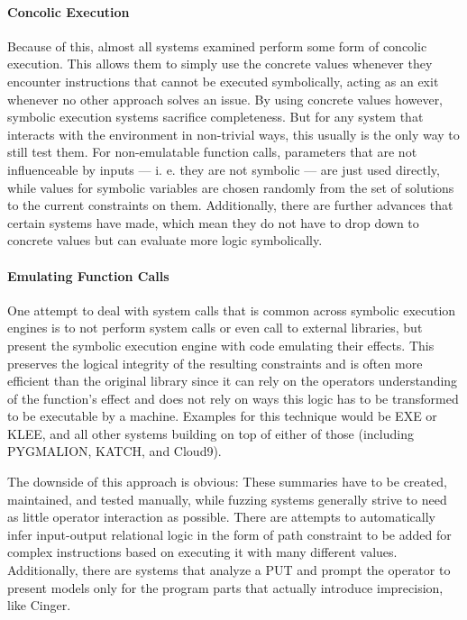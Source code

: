 \documentclass{article}
\begin{document}
\begin{multicols}{2}
    \paragraph{Concolic Execution}
    Because of this, almost all systems examined perform some form of concolic execution. This allows them to simply use the concrete values whenever they encounter instructions that cannot be executed symbolically, acting as an exit whenever no other approach solves an issue. By using concrete values however, symbolic execution systems sacrifice completeness. But for any system that interacts with the environment in non-trivial ways, this usually is the only way to still test them. For non-emulatable function calls, parameters that are not influenceable by inputs — i. e. they are not symbolic — are just used directly, while values for symbolic variables are chosen randomly from the set of solutions to the current constraints on them.\cite{PreliminaryAssessment} Additionally, there are further advances that certain systems have made, which mean they do not have to drop down to concrete values but can evaluate more logic symbolically.

    \paragraph{Emulating Function Calls}
    One attempt to deal with system calls that is common across symbolic execution engines is to not perform system calls or even call to external libraries, but present the symbolic execution engine with code emulating their effects. This preserves the logical integrity of the resulting constraints and is often more efficient than the original library since it can rely on the operators understanding of the function's effect and does not rely on ways this logic has to be transformed to be executable by a machine. Examples for this technique would be EXE\cite{EXE} or KLEE\cite{KLEE}, and all other systems building on top of either of those (including PYGMALION\cite{PYGMALION}, KATCH\cite{KATCH}, and Cloud9\cite{Cloud9}).

    The downside of this approach is obvious: These summaries have to be created, maintained, and tested manually, while fuzzing systems generally strive to need as little operator interaction as possible. There are attempts to automatically infer input-output relational logic in the form of path constraint to be added for complex instructions based on executing it with many different values\cite{ASSIE}. Additionally, there are systems that analyze a PUT and prompt the operator to present models only for the program parts that actually introduce imprecision, like Cinger\cite{Cinger}.


\end{multicols}
\end{document}
